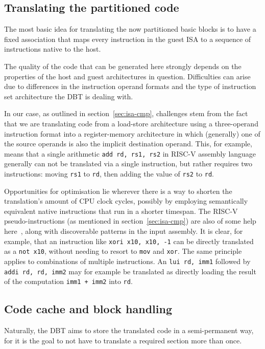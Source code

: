 \subsection{Translating the partitioned code}
The most basic idea for translating the now partitioned basic blocks is to have a fixed association that maps every instruction in the guest ISA to a sequence of instructions native to the host.

The quality of the code that can be generated here strongly depends on the properties of the host and guest architectures in question.
Difficulties can arise due to differences in the instruction operand formats and the type of instruction set architecture the DBT is dealing with.

In our case, as outlined in section~\ref{sec:isa-cmp}, challenges stem from the fact that we are translating code from a load-store architecture using a three-operand instruction format into a register-memory architecture in which (generally) one of the source operands is also the implicit destination operand.
This, for example, means that a single arithmetic \texttt{add rd, rs1, rs2} in RISC-V assembly language generally can not be translated via a single instruction, but rather requires two instructions: moving \texttt{rs1} to \texttt{rd}, then adding the value of \texttt{rs2} to \texttt{rd}.

Opportunities for optimisation lie wherever there is a way to shorten the translation's amount of CPU clock cycles, possibly by employing semantically equivalent native instructions that run in a shorter timespan.
The RISC-V pseudo-instructions (as mentioned in section~\ref{sec:isa-cmp}) are also of some help here~\cite[S. 139]{riscvspec}, along with discoverable patterns in the input assembly.
It is clear, for example, that an instruction like \texttt{xori x10, x10, -1} can be directly translated as a \texttt{not x10}, without needing to resort to \texttt{mov} and \texttt{xor}.
The same principle applies to combinations of multiple instructions.
An \texttt{lui rd, imm1} followed by \texttt{addi rd, rd, imm2} may for example be translated as directly loading the result of the computation \texttt{imm1 + imm2} into \texttt{rd}.

\subsection{Code cache and block handling}
Naturally, the DBT aims to store the translated code in a semi-permanent way, for it is the goal to not have to translate a required section more than once.

